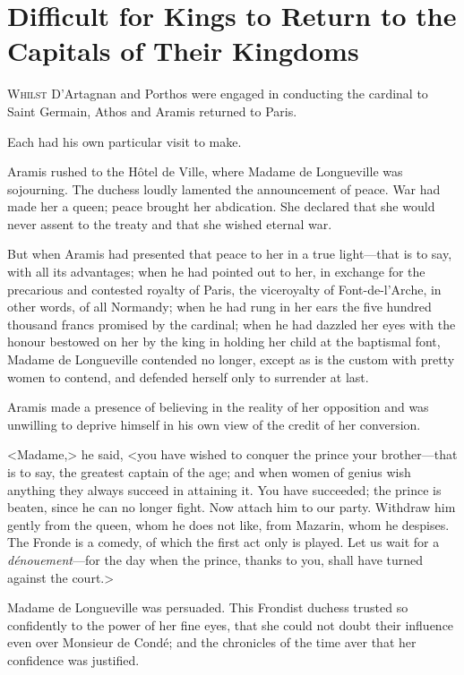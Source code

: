 \chapter[Difficult for Kings to Return to Their Capitals]{Difficult for Kings to Return to the Capitals of Their Kingdoms}

 \lettrine{W}{hilst} D'Artagnan and Porthos were engaged in conducting the cardinal to Saint Germain, Athos and Aramis returned to Paris.

\zz
Each had his own particular visit to make.

\zz
Aramis rushed to the Hôtel de Ville, where Madame de Longueville was sojourning. The duchess loudly lamented the announcement of peace. War had made her a queen; peace brought her abdication. She declared that she would never assent to the treaty and that she wished eternal war.

But when Aramis had presented that peace to her in a true light—that is to say, with all its advantages; when he had pointed out to her, in exchange for the precarious and contested royalty of Paris, the viceroyalty of Font-de-l'Arche, in other words, of all Normandy; when he had rung in her ears the five hundred thousand francs promised by the cardinal; when he had dazzled her eyes with the honour bestowed on her by the king in holding her child at the baptismal font, Madame de Longueville contended no longer, except as is the custom with pretty women to contend, and defended herself only to surrender at last.

Aramis made a presence of believing in the reality of her opposition and was unwilling to deprive himself in his own view of the credit of her conversion.

<Madame,> he said, <you have wished to conquer the prince your brother—that is to say, the greatest captain of the age; and when women of genius wish anything they always succeed in attaining it. You have succeeded; the prince is beaten, since he can no longer fight. Now attach him to our party. Withdraw him gently from the queen, whom he does not like, from Mazarin, whom he despises. The Fronde is a comedy, of which the first act only is played. Let us wait for a \textit{dénouement}—for the day when the prince, thanks to you, shall have turned against the court.>

Madame de Longueville was persuaded. This Frondist duchess trusted so confidently to the power of her fine eyes, that she could not doubt their influence even over Monsieur de Condé; and the chronicles of the time aver that her confidence was justified.


